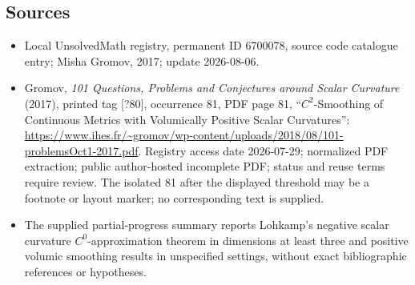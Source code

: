 \documentclass[11pt]{article}
\begin{document}
\subsection{Sources}
\begin{itemize}
\item Local UnsolvedMath registry, permanent ID 6700078, source code catalogue entry; Misha Gromov, 2017; update 2026-08-06.
\item Gromov, \emph{101 Questions, Problems and Conjectures around Scalar Curvature} (2017), printed tag [?80], occurrence 81, PDF page 81, ``\(C^2\)-Smoothing of Continuous Metrics with Volumically Positive Scalar Curvatures'': \url{https://www.ihes.fr/~gromov/wp-content/uploads/2018/08/101-problemsOct1-2017.pdf}. Registry access date 2026-07-29; normalized PDF extraction; public author-hosted incomplete PDF; status and reuse terms require review. The isolated 81 after the displayed threshold may be a footnote or layout marker; no corresponding text is supplied.
\item The supplied partial-progress summary reports Lohkamp's negative scalar curvature \(C^0\)-approximation theorem in dimensions at least three and positive volumic smoothing results in unspecified settings, without exact bibliographic references or hypotheses.
\end{itemize}
\end{document}
